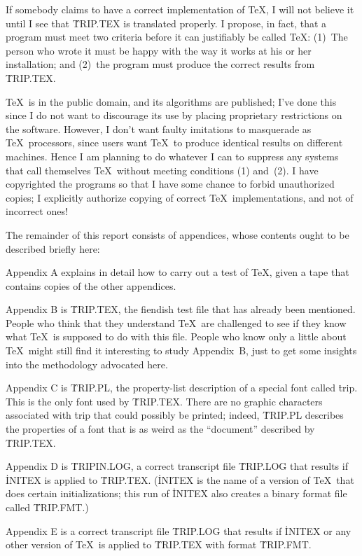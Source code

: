 If somebody claims to have a correct implementation of \TeX, I will not
believe it until I see that \.{TRIP.TEX} is translated properly.
I propose, in fact, that a program must meet two criteria before it
can justifiably be called \TeX: (1)~The person who wrote it must be
happy with the way it works at his or her installation; and (2)~the
program must produce the correct results from \.{TRIP.TEX}.

\TeX\ is in the public domain, and its algorithms are published;
I've done this since I do not want to discourage its use by placing
proprietary restrictions on the software. However, I don't want
faulty imitations to masquerade as \TeX\ processors, since users
want \TeX\ to produce identical results on different machines.
Hence I am planning to do whatever I can to suppress any systems that
call themselves \TeX\ without meeting conditions (1) and~(2).
I have copyrighted the programs so that I have some chance to forbid
unauthorized copies; I explicitly authorize copying of correct
\TeX\ implementations, and not of incorrect ones!

The remainder of this report consists of appendices, whose contents ought
to be described briefly here:

Appendix A explains in detail how to carry out a test of \TeX, given
a tape that contains copies of the other appendices.

Appendix B is \.{TRIP.TEX}, the fiendish test file that has already
been mentioned. People who think that they understand \TeX\ are challenged
to see if they know what \TeX\ is supposed to do with this file.
People who know only a little about \TeX\ might still find it
interesting to study Appendix~B, just to get some insights into the
methodology advocated here.

Appendix C is \.{TRIP.PL}, the property-list description of a
special font called \.{trip}. This is the only font used by \.{TRIP.TEX}.
There are no graphic characters associated with \.{trip} that could
possibly be printed; indeed, \.{TRIP.PL} describes the properties of a font
that is as weird as the ``document'' described by \.{TRIP.TEX}.

Appendix D is \.{TRIPIN.LOG}, a correct transcript file \.{TRIP.LOG}
that results if \.{INITEX} is applied to \.{TRIP.TEX}. (\.{INITEX} is
the name of a version of \TeX\ that does certain initializations;
this run of \.{INITEX} also creates a binary format file called \.{TRIP.FMT}.)

Appendix E is a correct transcript file \.{TRIP.LOG} that results if
\.{INITEX} or any other version of \TeX\ is applied to \.{TRIP.TEX}
with format \.{TRIP.FMT}.


